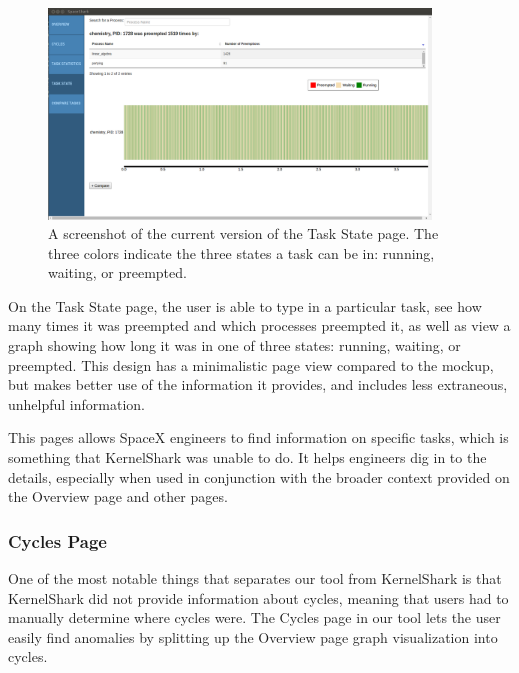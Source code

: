 \documentclass{hmcclinic}
\begin{document}
\begin{figure}[H]
\begin{center}
\includegraphics[width=4in]{task-state-page.png}
\caption{A screenshot of the current version of the Task State page. The three
colors indicate the three states a task can be in: running, waiting, or
preempted.}
\end{center}
\end{figure}

On the Task State page, the user is able to type in a particular task, see
how many times it was preempted and which processes preempted it, as well as
view a graph showing how long it was in one of three states: running, waiting,
or preempted. This design has a minimalistic page view compared to the mockup,
but makes better use of the information it provides, and includes less
extraneous, unhelpful information.

This pages allows SpaceX engineers to find information on specific tasks, which
is something that KernelShark was unable to do. It helps engineers dig in to the
details, especially when used in conjunction with the broader context provided
on the Overview page and other pages.

\subsubsection{Cycles Page}

One of the most notable things that separates our tool from KernelShark is that
KernelShark did not provide information about cycles, meaning that users had to
manually determine where cycles were.
The Cycles page in our tool lets the user easily find anomalies by splitting up
the Overview page graph visualization into cycles.
\end{document}
